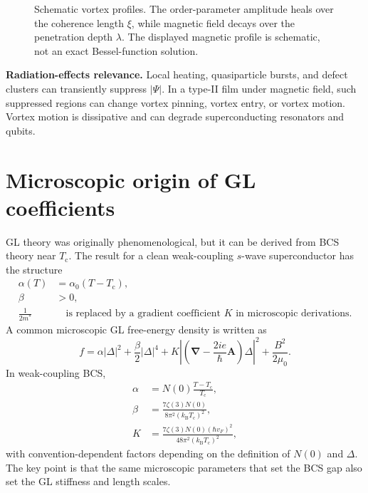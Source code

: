 \documentclass[11pt]{article}
\numberwithin{equation}{section}
\newcommand{\kB}{k_{\mathrm{B}}}
\newcommand{\Avec}{\bm{A}}
\renewcommand{\grad}{\bm{\nabla}}
\newcommand{\Tc}{T_{\mathrm{c}}}
\newcommand{\Nzero}{N(0)}
\begin{document}
\begin{figure}[H]
\centering
{}
\caption{Schematic vortex profiles. The order-parameter amplitude heals over the coherence length $\xi$, while magnetic field decays over the penetration depth $\lambda$. The displayed magnetic profile is schematic, not an exact Bessel-function solution.}
\end{figure}

\begin{notebox}
\textbf{Radiation-effects relevance.} Local heating, quasiparticle bursts, and defect clusters can transiently suppress $|\Psi|$. In a type-II film under magnetic field, such suppressed regions can change vortex pinning, vortex entry, or vortex motion. Vortex motion is dissipative and can degrade superconducting resonators and qubits.
\end{notebox}

\section{Microscopic origin of GL coefficients}

GL theory was originally phenomenological, but it can be derived from BCS theory near $\Tc$. The result for a clean weak-coupling $s$-wave superconductor has the structure
\begin{align}
\alpha(T)&=\alpha_0(T-\Tc),\\
\beta&>0,\\
\frac{1}{2m^*}&\quad \text{is replaced by a gradient coefficient } K \text{ in microscopic derivations.}
\end{align}
A common microscopic GL free-energy density is written as
\begin{equation}
f=\alpha |\Delta|^2+\frac{\beta}{2}|\Delta|^4+K\left|\left(\grad-\frac{2ie}{\hbar}\Avec\right)\Delta\right|^2+\frac{B^2}{2\mu_0}.
\end{equation}
In weak-coupling BCS,
\begin{align}
\alpha&=\Nzero\frac{T-\Tc}{\Tc},\\
\beta&=\frac{7\zeta(3)\Nzero}{8\pi^2(\kB\Tc)^2},\\
K&=\frac{7\zeta(3)\Nzero(\hbar v_F)^2}{48\pi^2(\kB\Tc)^2},
\end{align}
with convention-dependent factors depending on the definition of $\Nzero$ and $\Delta$. The key point is that the same microscopic parameters that set the BCS gap also set the GL stiffness and length scales.
\end{document}
